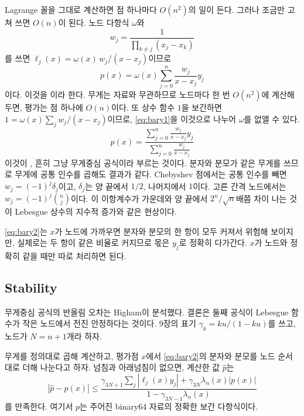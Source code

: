 Lagrange 꼴을 그대로 계산하면 점 하나마다 $O(n^2)$의 일이 든다. 그러나 조금만 고쳐 쓰면 $O(n)$이 된다. 노드 다항식 $\omega$와 
\[
w_j=\frac1{\prod_{k\ne j}(x_j-x_k)}
\]
를 쓰면 $\ell_j(x)=\omega(x)\,w_j/(x-x_j)$이므로
\begin{equation}
\label{eq:bary1}
p(x)=\omega(x)\sum_{j=0}^n\frac{w_j}{x-x_j}y_j
\end{equation}
이다. 이것을 이라 한다. 무게는 자료와 무관하므로 노드마다 한 번 $O(n^2)$에 계산해 두면, 평가는 점 하나에 $O(n)$이다. 또 상수 함수 $1$을 보간하면 $1=\omega(x)\sum_jw_j/(x-x_j)$이므로, \eqref{eq:bary1}을 이것으로 나누어 $\omega$를 없앨 수 있다.
\begin{equation}
\label{eq:bary2}
p(x)=\frac{\displaystyle\sum_{j=0}^n\frac{w_j}{x-x_j}y_j}{\displaystyle\sum_{j=0}^n\frac{w_j}{x-x_j}}
\end{equation}
이것이 , 흔히 그냥 무게중심 공식이라 부르는 것이다\cite{berrut2004barycentric}. 분자와 분모가 같은 무게를 쓰므로 무게에 공통 인수를 곱해도 결과가 같다. Chebyshev 점에서는 공통 인수를 빼면 $w_j=(-1)^j\delta_j$이고, $\delta_j$는 양 끝에서 $1/2$, 나머지에서 $1$이다\cite{salzer1972}. 고른 간격 노드에서는 $w_j=(-1)^j\binom nj$이다. 이 이항계수가 가운데와 양 끝에서 $2^n/\sqrt n$배쯤 차이 나는 것이 Lebesgue 상수의 지수적 증가와 같은 현상이다.

\eqref{eq:bary2}는 $x$가 노드에 가까우면 분자와 분모의 한 항이 모두 커져서 위험해 보이지만, 실제로는 두 항이 같은 비율로 커지므로 몫은 $y_j$로 정확히 다가간다. $x$가 노드와 정확히 같을 때만 따로 처리하면 된다.

\subsection{Stability}

무게중심 공식의 반올림 오차는 Higham이 분석했다\cite{higham2004barycentric}. 결론은 둘째 공식이 Lebesgue 함수가 작은 노드에서 전진 안정하다는 것이다. 9장의 표기 $\gamma_k=ku/(1-ku)$를 쓰고, 노드가 $N=n+1$개라 하자.

\begin{theorem}
\label{thm:bary-stability}
무게를 정의대로 곱해 계산하고, 평가점 $x$에서 \eqref{eq:bary2}의 분자와 분모를 노드 순서대로 더해 나눈다고 하자. 넘침과 아래넘침이 없으면, 계산한 값 $\hat p$는
\[
|\hat p-p(x)|\le\frac{\gamma_{3N+1}\sum_j|\ell_j(x)y_j|+\gamma_{3N}\lambda_n(x)|p(x)|}{1-\gamma_{3N-1}\lambda_n(x)}
\]
를 만족한다. 여기서 $p$는 주어진 binary64 자료의 정확한 보간 다항식이다.
\end{theorem}

